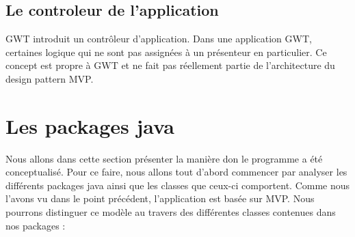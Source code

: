 \subsection{Le controleur de l'application} 
GWT introduit un contrôleur d'application. Dans une application GWT, certaines logique qui ne sont pas assignées à un présenteur en particulier. Ce concept est propre à GWT et ne fait pas réellement partie de l'architecture du design pattern MVP. 
 
\section{Les packages java}
Nous allons dans cette section présenter la manière don le programme a été conceptualisé. Pour ce faire, nous allons tout d'abord commencer par analyser les différents packages java ainsi que les classes que ceux-ci comportent. Comme nous l'avons vu dans le point précédent, l'application est basée sur MVP. Nous pourrons distinguer ce modèle au travers des différentes classes contenues dans nos packages : \\

